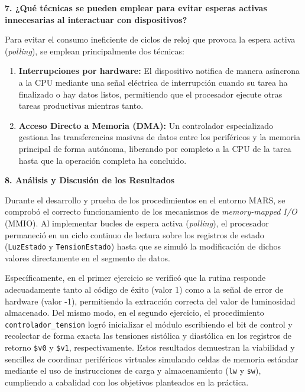 \documentclass[11pt,a4paper]{article}
\begin{document}
\vspace{0.4cm}
\noindent\textbf{7. ¿Qué técnicas se pueden emplear para evitar esperas activas innecesarias al interactuar con dispositivos?}

\vspace{0.5cm}
Para evitar el consumo ineficiente de ciclos de reloj que provoca la espera activa (\textit{polling}), se emplean principalmente dos técnicas:
\begin{enumerate}
    \item \textbf{Interrupciones por hardware:} El dispositivo notifica de manera asíncrona a la CPU mediante una señal eléctrica de interrupción cuando su tarea ha finalizado o hay datos listos, permitiendo que el procesador ejecute otras tareas productivas mientras tanto.
    \item \textbf{Acceso Directo a Memoria (DMA):} Un controlador especializado gestiona las transferencias masivas de datos entre los periféricos y la memoria principal de forma autónoma, liberando por completo a la CPU de la tarea hasta que la operación completa ha concluido.
\end{enumerate}

\vspace{0.4cm}
\noindent\textbf{8. Análisis y Discusión de los Resultados}

\vspace{0.5cm}
Durante el desarrollo y prueba de los procedimientos en el entorno MARS, se comprobó el correcto funcionamiento de los mecanismos de \textit{memory-mapped I/O} (MMIO). Al implementar bucles de espera activa (\textit{polling}), el procesador permaneció en un ciclo continuo de lectura sobre los registros de estado (\texttt{LuzEstado} y \texttt{TensionEstado}) hasta que se simuló la modificación de dichos valores directamente en el segmento de datos. 

Específicamente, en el primer ejercicio se verificó que la rutina responde adecuadamente tanto al código de éxito (valor 1) como a la señal de error de hardware (valor -1), permitiendo la extracción correcta del valor de luminosidad almacenado. Del mismo modo, en el segundo ejercicio, el procedimiento \texttt{controlador\_tension} logró inicializar el módulo escribiendo el bit de control y recolectar de forma exacta las tensiones sistólica y diastólica en los registros de retorno \texttt{\$v0} y \texttt{\$v1}, respectivamente. Estos resultados demuestran la viabilidad y sencillez de coordinar periféricos virtuales simulando celdas de memoria estándar mediante el uso de instrucciones de carga y almacenamiento (\texttt{lw} y \texttt{sw}), cumpliendo a cabalidad con los objetivos planteados en la práctica.
\end{document}
